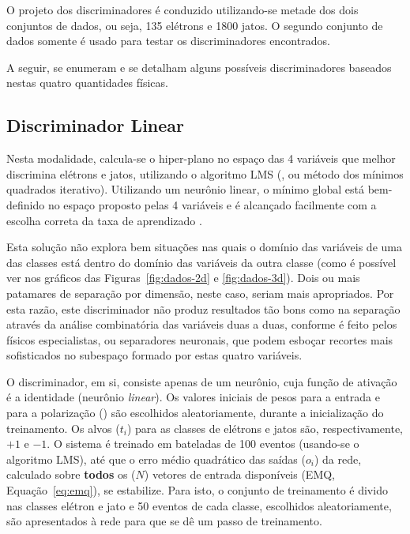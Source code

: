 O projeto dos discriminadores é conduzido utilizando-se metade dos dois
conjuntos de dados, ou seja, 135 elétrons e 1800 jatos. O segundo conjunto de
dados somente é usado para testar os discriminadores encontrados.

A seguir, se enumeram e se detalham alguns possíveis discriminadores baseados
nestas quatro quantidades físicas.

\subsection{Discriminador Linear}

Nesta modalidade, calcula-se o hiper-plano no espaço das 4 variáveis que
melhor discrimina elétrons e jatos, utilizando o algoritmo LMS (, ou método dos mínimos quadrados iterativo). Utilizando um
neurônio linear, o mínimo global está bem-definido no espaço proposto pelas 4
variáveis e é alcançado facilmente com a escolha correta da taxa de
aprendizado \cite{widrow, haykin}.

Esta solução não explora bem situações nas quais o domínio das variáveis de
uma das classes está dentro do domínio das variáveis da outra classe (como é
possível ver nos gráficos das Figuras~\ref{fig:dados-2d} e
\ref{fig:dados-3d}). Dois ou mais patamares de separação por dimensão, neste
caso, seriam mais apropriados. Por esta razão, este discriminador não produz
resultados tão bons como na separação através da análise combinatória das
variáveis duas a duas, conforme é feito pelos físicos especialistas, ou
separadores neuronais, que podem esboçar recortes mais sofisticados no
subespaço formado por estas quatro variáveis.

O discriminador, em si, consiste apenas de um neurônio, cuja função de
ativação é a identidade (neurônio \textit{linear}). Os valores iniciais de
pesos para a entrada e para a polarização () são escolhidos
aleatoriamente, durante a inicialização do treinamento. Os alvos ($t_i$) para
as classes de elétrons e jatos são, respectivamente, $+1$ e $-1$. O sistema é
treinado em bateladas de 100 eventos (usando-se o algoritmo LMS), até que o
erro médio quadrático das saídas ($o_i$) da rede, calculado sobre
\textbf{todos} os ($N$) vetores de entrada disponíveis (EMQ,
Equação~\ref{eq:emq}), se estabilize. Para isto, o conjunto de treinamento é
divido nas classes elétron e jato e 50 eventos de cada classe, escolhidos
aleatoriamente, são apresentados à rede para que se dê um passo de
treinamento.

